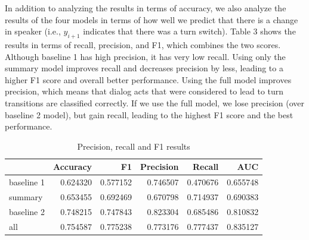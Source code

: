 In addition to analyzing the results in terms of accuracy, we also analyze the results of the four models in terms of how well we predict that there is a change in speaker (i.e., $y_{i+1}$  indicates that there was a turn switch).  Table 3 shows the results in terms of recall, precision, and F1, which combines the two scores.  Although baseline 1 has high precision, it has very low recall. Using only the summary model improves recall and decreases precision by less,
leading to a higher F1 score and overall better performance. Using the full model improves precision, which means that dialog acts
that were considered to lead to turn transitions are classified correctly. If we use the full model, we lose precision (over baseline 2 model), but gain recall,
leading to the highest F1 score and the best performance.
%
\begin{table}[ht!]
\begin{center}
\begin{tabular}{lrrrrr}
\toprule
{} &  Accuracy &        F1 &  Precision &    Recall &   AUC \\
\midrule
baseline 1&  0.624320 &  0.577152 &   0.746507 &  0.470676 &  0.655748 \\
summary   &  0.653455 &  0.692469 &   0.670798 &  0.714937 &  0.690383 \\
baseline 2&  0.748215 &  0.747843 &   0.823304 &  0.685486 &  0.810832 \\
all       &  0.754587 &  0.775238 &   0.773176 &  0.777437 &  0.835127 \\
\bottomrule
\end{tabular}
\end{center}
\caption{Precision, recall and F1 results }
\end{table}



